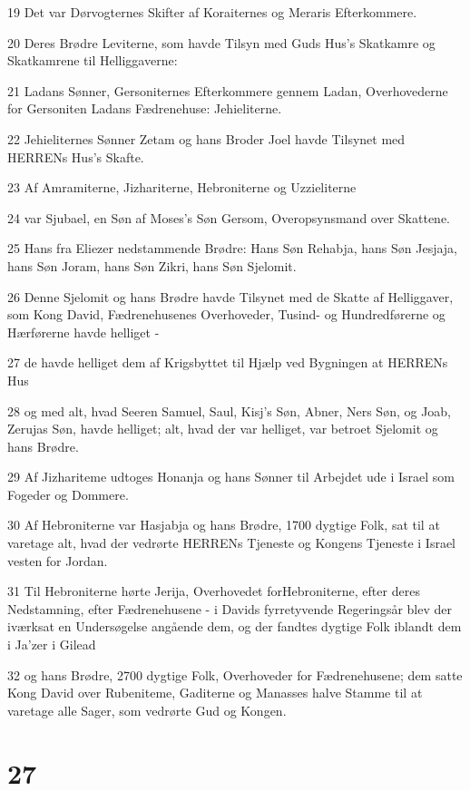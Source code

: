 \par 19 Det var Dørvogternes Skifter af Koraiternes og Meraris Efterkommere.
\par 20 Deres Brødre Leviterne, som havde Tilsyn med Guds Hus's Skatkamre og Skatkamrene til Helliggaverne:
\par 21 Ladans Sønner, Gersoniternes Efterkommere gennem Ladan, Overhovederne for Gersoniten Ladans Fædrenehuse: Jehieliterne.
\par 22 Jehieliternes Sønner Zetam og hans Broder Joel havde Tilsynet med HERRENs Hus's Skafte.
\par 23 Af Amramiterne, Jizhariterne, Hebroniterne og Uzzieliterne
\par 24 var Sjubael, en Søn af Moses's Søn Gersom, Overopsynsmand over Skattene.
\par 25 Hans fra Eliezer nedstammende Brødre: Hans Søn Rehabja, hans Søn Jesjaja, hans Søn Joram, hans Søn Zikri, hans Søn Sjelomit.
\par 26 Denne Sjelomit og hans Brødre havde Tilsynet med de Skatte af Helliggaver, som Kong David, Fædrenehusenes Overhoveder, Tusind- og Hundredførerne og Hærførerne havde helliget -
\par 27 de havde helliget dem af Krigsbyttet til Hjælp ved Bygningen at HERRENs Hus
\par 28 og med alt, hvad Seeren Samuel, Saul, Kisj's Søn, Abner, Ners Søn, og Joab, Zerujas Søn, havde helliget; alt, hvad der var helliget, var betroet Sjelomit og hans Brødre.
\par 29 Af Jizhariteme udtoges Honanja og hans Sønner til Arbejdet ude i Israel som Fogeder og Dommere.
\par 30 Af Hebroniterne var Hasjabja og hans Brødre, 1700 dygtige Folk, sat til at varetage alt, hvad der vedrørte HERRENs Tjeneste og Kongens Tjeneste i Israel vesten for Jordan.
\par 31 Til Hebroniterne hørte Jerija, Overhovedet forHebroniterne, efter deres Nedstamning, efter Fædrenehusene - i Davids fyrretyvende Regeringsår blev der iværksat en Undersøgelse angående dem, og der fandtes dygtige Folk iblandt dem i Ja'zer i Gilead
\par 32 og hans Brødre, 2700 dygtige Folk, Overhoveder for Fædrenehusene; dem satte Kong David over Rubeniteme, Gaditerne og Manasses halve Stamme til at varetage alle Sager, som vedrørte Gud og Kongen.

\chapter{27}

